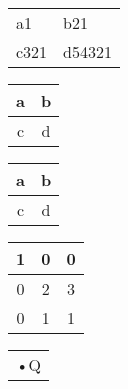 \documentclass[a4paper,11pt]{book} %
\begin{document}
	\begin{center}
	\end{center}


	\begin{tabular}{ll|}
		\hline
		\vline a1 &  \vline b21 \\
		c321 & d54321 \\
	\end{tabular}
	\begin{tabular}{|c|c|}
		\hline
		a & b \\
		\hline
		c & d \\
		\hline
	\end{tabular}	
	\begin{center}
		\begin{tabular}{|c|c|}
			\hline
			a & b \\ \hline
			c & d \\
			\hline
		\end{tabular}
	\end{center}

    \begin{tabular}{|c|c|c|}
      \hline
      1 & 0 & 0 \\ \hline
      0 & 2 & 3 \\ \hline
      0 & 1 & 1 \\
      \hline
    \end{tabular}
	
	\begin{tabular}{|r|}
	•Q
	\end{tabular}
\end{document}
